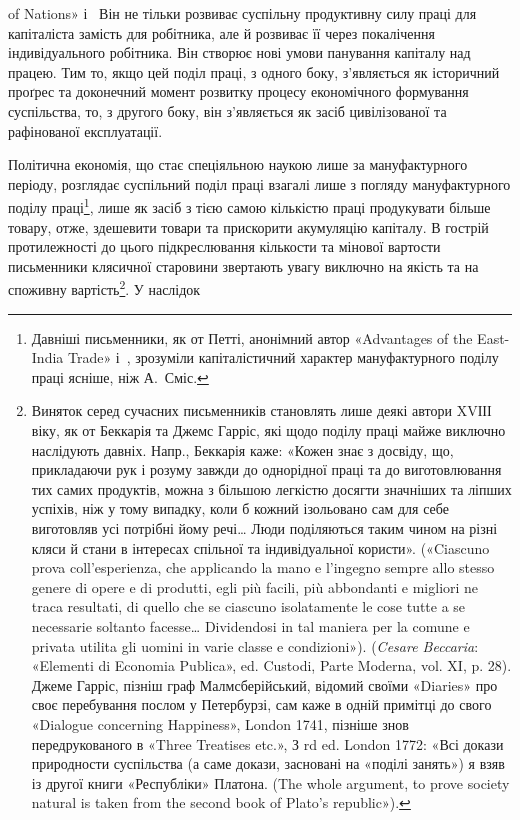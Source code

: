 \parcont{}  %
of Nations» і~ Він не тільки розвиває суспільну продуктивну
силу праці для капіталіста замість для робітника, але й розвиває
її через покалічення індивідуального робітника. Він створює
нові умови панування капіталу над працею. Тим то, якщо цей
поділ праці, з одного боку, з’являється як історичний проґрес
та доконечний момент розвитку процесу економічного формування
суспільства, то, з другого боку, він з’являється як засіб
цивілізованої та рафінованої експлуатації.

Політична економія, що стає спеціяльною наукою лише за
мануфактурного періоду, розглядає суспільний поділ праці взагалі
лише з погляду мануфактурного поділу праці\footnote{
Давніші письменники, як от Петті, анонімний автор «Advantages
of the East-India Trade» і~, зрозуміли капіталістичний характер
мануфактурного поділу праці ясніше, ніж А.~Сміс.
}, лише як
засіб з тією самою кількістю праці продукувати більше товару,
отже, здешевити товари та прискорити акумуляцію капіталу.
В гострій протилежності до цього підкреслювання кількости та
мінової вартости письменники клясичної старовини звертають
увагу виключно на якість та на споживну вартість\footnote{
Виняток серед сучасних письменників становлять лише деякі
автори XVІІІ віку, як от Беккарія та Джемс Гарріс, які щодо поділу
праці майже виключно наслідують давніх. Напр., Беккарія каже: «Кожен
знає з досвіду, що, прикладаючи рук і розуму завжди до однорідної праці
та до виготовлювання тих самих продуктів, можна з більшою легкістю
досягти значніших та ліпших успіхів, ніж у тому випадку, коли б кожний
ізольовано сам для себе виготовляв усі потрібні йому речі\dots{} Люди поділяються
таким чином на різні кляси й стани в інтересах спільної та індивідуальної
користи». («Ciascuno prova coll’esperienza, che applicando
la mano e l’ingegno sempre allo stesso genere di opere e di produtti, egli
più facili, più abbondanti e migliori ne traca resultati, di quello che se
ciascuno isolatamente le cose tutte a se necessarie soltanto facesse\dots{} Dividendosi
in tal maniera per la comune e privata utilita gli uomini
in varie classe e condizioni»). (\emph{Cesare Beccaria}: «Elementi di Economia
Publica», ed. Custodi, Parte Moderna, vol. XI, p. 28). Джеме
Гарріс, пізніш граф Малмсберійський, відомий своїми «Diaries» про
своє перебування послом у Петербурзі, сам каже в одній примітці до
свого «Dialogue concerning Happiness», London 1741, пізніше знов передрукованого
в «Three Treatises etc.», З rd ed. London 1772: «Всі докази
природности суспільства (а саме докази, засновані на «поділі занять»)
я взяв із другої книги «Республіки» Платона. (The whole argument,
to prove society natural is taken from the second book of Plato’s
republic»).
}. У наслідок
